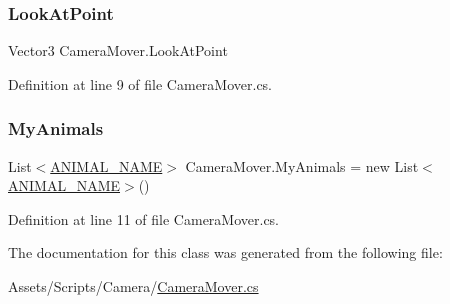\subsubsection{\texorpdfstring{Look\+At\+Point}{LookAtPoint}}
{\footnotesize\ttfamily Vector3 Camera\+Mover.\+Look\+At\+Point\hspace{0.3cm}{\ttfamily [static]}}



Definition at line 9 of file Camera\+Mover.\+cs.

\mbox{\label{class_camera_mover_a5c2dba444b1de7c8354809cf0650fabf}} 
\subsubsection{\texorpdfstring{My\+Animals}{MyAnimals}}
{\footnotesize\ttfamily List$<$\mbox{\hyperlink{_animal_8cs_a2fa5713399b84d1b88dae9196837af50}{A\+N\+I\+M\+A\+L\+\_\+\+N\+A\+ME}}$>$ Camera\+Mover.\+My\+Animals = new List$<$\mbox{\hyperlink{_animal_8cs_a2fa5713399b84d1b88dae9196837af50}{A\+N\+I\+M\+A\+L\+\_\+\+N\+A\+ME}}$>$()}



Definition at line 11 of file Camera\+Mover.\+cs.



The documentation for this class was generated from the following file\+:\begin{DoxyCompactItemize}
\item 
Assets/\+Scripts/\+Camera/\mbox{\hyperlink{_camera_mover_8cs}{Camera\+Mover.\+cs}}\end{DoxyCompactItemize}
